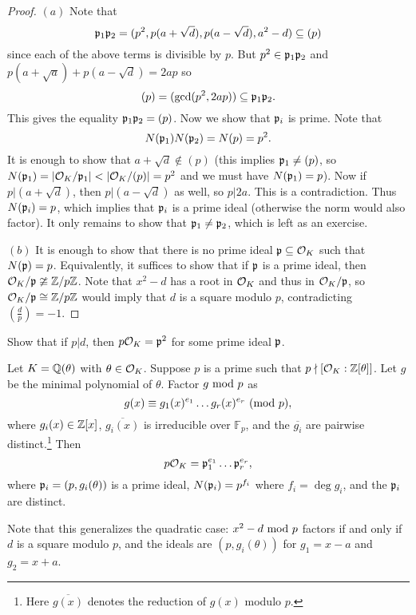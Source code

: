 \begin{proof}
  $(a)$ Note that
  \[
    \mathfrak{p}_1 \mathfrak{p}_2 = (p^2, p(a + \sqrt{d}), p(a - \sqrt{d}), a^2 - d) \subseteq (p)
  \]
  since each of the above terms is divisible by $p$.
  But $p^2 \in \mathfrak{p}_1 \mathfrak{p}_2$ and
  $p(a + \sqrt{a}) + p(a - \sqrt{d}) = 2ap$ so
  \[
    (p) = (\gcd(p^2, 2ap)) \subseteq \mathfrak{p}_1 \mathfrak{p}_2.
  \]
  This gives the equality $\mathfrak{p}_1 \mathfrak{p}_2 = (p)$. Now we
  show that $\mathfrak{p}_i$ is prime. Note that
  \[
    N(\mathfrak{p}_1) N(\mathfrak{p}_2) = N(p) = p^2.
  \]
  It is enough to show that $a + \sqrt{d} \notin (p)$
  (this implies $\mathfrak{p}_1 \ne (p)$, so
  $N(\mathfrak{p}_1) = |\mathcal{O}_K / \mathfrak{p}_1| < |\mathcal{O}_K / (p)| = p^2$ and
  we must have $N(\mathfrak{p}_1) = p$).
  Now if $p | (a + \sqrt{d})$, then
  $p | (a - \sqrt{d})$ as well, so $p | 2a$. This is a
  contradiction. Thus $N(\mathfrak{p}_i) = p$, which implies
  that $\mathfrak{p}_i$ is a prime ideal (otherwise the norm
  would also factor). It only remains to show that
  $\mathfrak{p}_1 \ne \mathfrak{p}_2$, which is left as an exercise.

  $(b)$ It is enough to show that there is no prime
  ideal $\mathfrak{p} \subseteq \mathcal{O}_K$ such that $N(\mathfrak{p}) = p$.
  Equivalently, it suffices to show that if $\mathfrak{p}$ is a
  prime ideal, then
  $\mathcal{O}_K / \mathfrak{p} \ncong \mathbb{Z} / p\mathbb{Z}$.  Note that $x^2 - d$
  has a root in $\mathcal{O}_K$ and thus in $\mathcal{O}_K / \mathfrak{p}$, so $\mathcal{O}_K / \mathfrak{p} \cong \mathbb{Z} / p\mathbb{Z}$ would imply that
  $d$ is a square modulo $p$, contradicting $(\frac{d}{p}) = -1$.
\end{proof}

\begin{exercise}
  Show that if $p | d$, then $p \mathcal{O}_K = \mathfrak{p}^2$ for some
  prime ideal $\mathfrak{p}$.
\end{exercise}

\begin{theorem}[Kummer]
  Let $K = \mathbb{Q}(\theta)$ with $\theta \in \mathcal{O}_K$.
  Suppose $p$ is a prime such that $p \nmid [\mathcal{O}_K : \mathbb{Z}[\theta]]$.
  Let $g$ be the minimal polynomial of $\theta$.
  Factor $g \ {\mathrm{mod}\ p}$ as
  \[
    g(x) \equiv g_1(x)^{e_1} \dots g_r(x)^{e_r} \ (\mathrm{mod}\ p),
  \]
  where $g_i(x) \in \mathbb{Z}[x]$, $\overline{g_i(x)}$ is
  irreducible over $\mathbb{F}_p$, and the
  $\overline{g_i}$ are pairwise distinct.\footnote{Here $\overline{g(x)}$ denotes the reduction of $g(x)$ modulo $p$.} Then
  \[
    p \mathcal{O}_K = \mathfrak{p}_1^{e_1} \dots \mathfrak{p}_r^{e_r},
  \]
  where $\mathfrak{p}_i = (p, g_i(\theta))$ is a prime ideal,
  $N(\mathfrak{p}_i) = p^{f_i}$ where
  $f_i = \deg g_i$, and the $\mathfrak{p}_i$ are distinct.
\end{theorem}

\begin{remark}
  Note that this generalizes the quadratic case:
  $x^2 - d \ {\mathrm{mod}\ p}$ factors if and only if $d$ is a
  square modulo $p$, and
  the ideals are $(p, g_i(\theta))$ for
  $g_1 = x - a$ and $g_2 = x + a$.
\end{remark}
